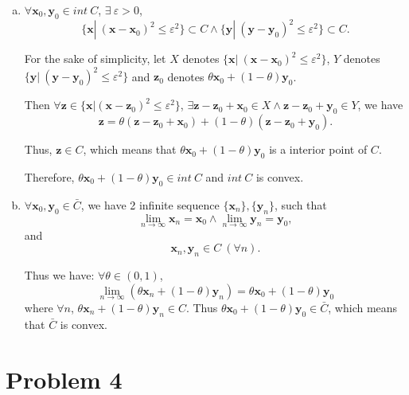 \documentclass{article}
\def\bx{\boldsymbol{x}}
\def\by{\boldsymbol{y}}
\def\bz{\boldsymbol{z}}
\def\convex#1#2{\theta#1+(1-\theta)#2}
\begin{document}
\begin{enumerate}[(a)]
	\item 
		$\forall \bx_0,\by_0 \in int\ C$, $\exists\ \varepsilon>0$,
		$$\big\{\bx|\ (\bx-\bx_0)^2\le\varepsilon^2\big\}\subset C\land\big\{\by|\ (\by-\by_0)^2\le\varepsilon^2\big\}\subset C.$$

		For the sake of simplicity, let 
		$X$ denotes $\big\{\bx|\ (\bx-\bx_0)^2\le\varepsilon^2\big\}$, 
		$Y$ denotes $\big\{\by|\ (\by-\by_0)^2\le\varepsilon^2\big\}$
		and 
		$\bz_0$ denotes $\theta \bx_0+(1-\theta)\by_0$.

		Then $\forall
		\bz\in\big\{\bx|(\bx-\bz_0)^2\le\varepsilon^2\big\}$,
		$
		\exists
		\bz-\bz_0+\bx_0\in X 
		\land
		\bz-\bz_0+\by_0\in Y
		$, we have
		$$\bz=\theta(\bz-\bz_0+\bx_0)+(1-\theta)(\bz-\bz_0+\by_0).$$

		Thus, $\bz\in C$, which means that $\theta \bx_0+(1-\theta)\by_0$ is a interior point of $C$.
		
		Therefore, $\theta \bx_0+(1-\theta)\by_0\in int\ C$ and $int\ C$ is convex.

		\newpage
	\item
		$\forall \bx_0,\by_0 \in \bar{C}$, we have 2 infinite sequence $\{\bx_n\},\{\by_n\}$, such that
		$$
		\lim_{n\to\infty}\bx_n=\bx_0
		\land
		\lim_{n\to\infty}\by_n=\by_0,
		$$
		and
		$$
		\bx_n,\by_n\in C\ (\forall n).
		$$
		
		Thus we have: $\forall \theta\in(0,1)$, 
		$$
		\lim_{n\to\infty}(\convex{\bx_n}{\by_n})=\convex{\bx_0}{\by_0}
		$$
		where $\forall n$, $\convex{\bx_n}{\by_n}\in C$. Thus  $\convex{\bx_0}{\by_0}\in \bar{C}$, which means that $\bar{C}$ is convex.
\end{enumerate}

\section*{Problem 4}
\end{document}
